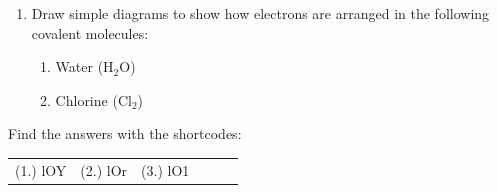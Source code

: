 \begin{enumerate}[noitemsep, label=\textbf{\arabic*}. ]
{\begin{center}
\begin{xtabular*}{\mytablewidth}[t]{|p{10\mystarwidth}|p{10\mystarwidth}|p{10\mystarwidth}|p{10\mystarwidth}|}
    
         &
    
    
         &
    
    
     \tabularnewline{}
    \end{xtabular*}
      \end{center}
    \begin{center}{\small\bfseries Table 5.1}\end{center}
    
    \addtocounter{footnote}{-0}
    
        }%
      
    \par
          \label{m38704*uid12}\item Draw simple diagrams to show how electrons are arranged in the following covalent molecules:
\label{m38704*id140030}\begin{enumerate}[noitemsep, label=\textbf{\alph*}. ] 
            \label{m38704*uid13}\item Water (\begin{math}\mathrm{H}{}_{2}\mathrm{O}\end{math})
\label{m38704*uid14}\item Chlorine (\begin{math}\mathrm{Cl}{}_{2}\end{math})
\end{enumerate}
                \end{enumerate}
        
        

      \label{m38704*eip-790}
\par {} Find the answers with the shortcodes:
 \par \begin{tabular}[h]{cccccc}
 (1.) lOY  &  (2.) lOr  &  (3.) lO1  & \end{tabular}



